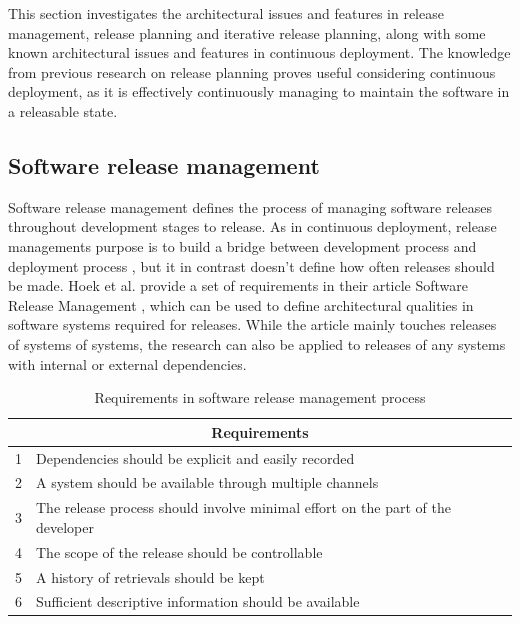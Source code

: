 \documentclass[conference]{IEEEtran}
\begin{document}
This section investigates the architectural issues and features in release management, release planning and iterative release planning, along with some known architectural issues and features in continuous deployment. The knowledge from previous research on release planning proves useful considering continuous deployment, as it is effectively continuously managing to maintain the software in a releasable state.

\subsection{Software release management}

Software release management defines the process of managing software releases throughout development stages to release. As in continuous deployment, release managements purpose is to build a bridge between development process and deployment process \cite{van1997software}, but it in contrast doesn't define how often releases should be made. Hoek et al. provide a set of requirements in their article Software Release Management \cite{van1997software}, which can be used to define architectural qualities in software systems required for releases. While the article mainly touches releases of systems of systems, the research can also be applied to releases of any systems with internal or external dependencies.

\begin{center}
\begin{table}[h]
\caption{Requirements in software release management process}
    \begin{tabular}{ | p{0.5cm} | p{7cm} |}
    \hline
    \multicolumn{2}{|c|}{Requirements} \\
    \hline
    1 & Dependencies should be explicit and easily recorded \\ \hline
    2 & A system should be available through multiple channels \\ \hline
    3 & The release process should involve minimal effort on the part of the developer \\ \hline
    4 & The scope of the release should be controllable \\ \hline
    5 & A history of retrievals should be kept \\ \hline
    6 & Sufficient descriptive information should be available \\ \hline
    \end{tabular}
    \end{table}
\end{center}
\end{document}

